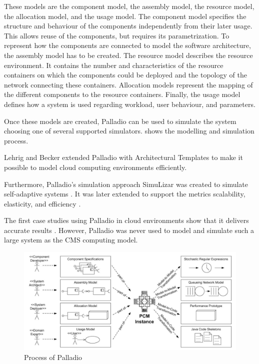 These models are the component model, the assembly model, the resource model, the allocation model, and the usage model.
The component model specifies the structure and behaviour of the components independently from their later usage. This allows reuse of the components, but requires its parametrization.
To represent how the components are connected to model the software architecture, the assembly model has to be created. 
The resource model describes the resource environment. It contains the number and characteristics of the resource containers on which the components could be deployed and the topology of the network connecting these containers.
Allocation models represent the mapping of the different components to the resource containers.
Finally, the usage model defines how a system is used regarding workload, user behaviour, and parameters.

Once these models are created, Palladio can be used to simulate the system choosing one of several supported simulators.  shows the modelling and simulation process. 

Lehrig and Becker \cite{arch} extended Palladio with Architectural Templates to make it possible to model cloud computing environments efficiently.

Furthermore, Palladio's simulation approach SimuLizar was created to simulate self-adaptive systems \cite{becker2013simulizar}.
It was later extended to support the metrics scalability, elasticity, and efficiency \cite{arch}.

The first case studies using Palladio in cloud environments show that it delivers accurate results \cite{arch}. However, Palladio was never used to model and simulate such a large system as the CMS computing model.

\begin{figure}
	\centering
	\includegraphics[width=1\linewidth]{images/palladio}
	\caption[]{Process of Palladio \cite{BECKER20093}}
	\label{fig:palladio}
\end{figure}


